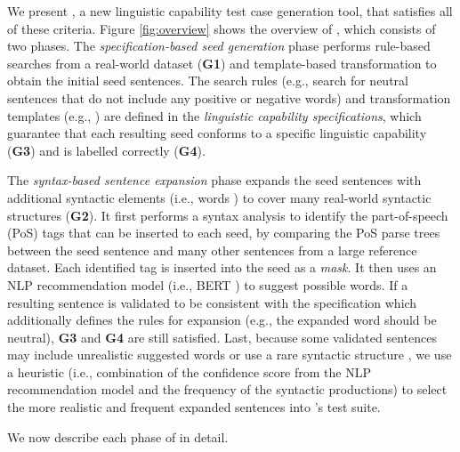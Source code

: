 We present \tool{}, a new linguistic capability test case generation
tool, that satisfies all of these criteria.    Figure
\ref{fig:overview} shows the overview of \tool{}, which consists of
two phases.  The \emph{specification-based seed generation} phase
performs rule-based searches from a real-world dataset ({\bf G1}) and
template-based transformation to obtain the initial seed sentences.
The search rules (e.g., search for neutral sentences that do not
include any positive or negative words) and transformation templates
(e.g., ) are defined in the \emph{linguistic
  capability specifications}, which guarantee that each resulting seed
conforms to a specific linguistic capability ({\bf G3}) and is
labelled correctly ({\bf G4}).

The \emph{syntax-based sentence expansion} phase expands the seed
sentences with additional syntactic elements (i.e., words )
to cover many real-world syntactic structures ({\bf G2}). It first
performs a syntax analysis to identify the part-of-speech (PoS) tags
that can be inserted to each seed, by comparing the PoS parse trees
between the seed sentence and many other sentences from a large
reference dataset. Each identified tag is inserted into the seed as a
\emph{mask}. It then uses an NLP recommendation model (i.e., BERT
\cite{}) to suggest possible words. If a resulting sentence is
validated to be consistent with the specification which additionally
defines the rules for expansion (e.g., the expanded word should be
neutral), {\bf G3} and {\bf G4} are still satisfied.  Last, because
some validated sentences may include unrealistic suggested words or
use a rare syntactic structure , we use a heuristic (i.e., combination of the confidence
score from the NLP recommendation model and the frequency of the
syntactic productions) to select the more realistic and frequent
expanded sentences into \tool{}'s test suite.

We now describe each phase of \tool{} in detail.


